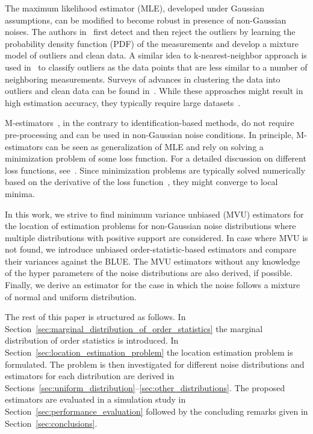 \documentclass{article}
\begin{document}
The maximum likelihood estimator (MLE), developed under Gaussian assumptions, can be modified to become robust in presence of non-Gaussian noises. The authors in~\citep{conf:ICML_eskin_00} first detect and then reject the outliers by learning the probability density function (PDF) of the measurements and develop a mixture model of outliers and clean data. A similar idea to k-nearest-neighbor approach is used in~\citep{article:DMKD_chawla_10} to classify outliers as the data points that are less similar to a number of neighboring measurements. Surveys of advances in clustering the data into outliers and clean data can be found in~\citep{article:AIR_hodge_04,article:ITSP_yin_13,conf:ICASSP_fritsche_09}. While these approaches might result in high estimation accuracy, they typically require large datasets~\citep{article:ISPM_zoubir_12}.

M-estimators~\citep{book:RS_huber}, in the contrary to identification-based methods, do not require pre-processing and can be used in non-Gaussian noise conditions. In principle, M-estimators can be seen as generalization of MLE and rely on solving a minimization problem of some loss function. For a detailed discussion on different loss functions, see~\citep{book:RS_huber}. Since minimization problems are typically solved numerically based on the derivative of the loss function~\citep{book:RSTM_maronna}, they might converge to local minima.

In this work, we strive to find minimum variance unbiased (MVU) estimators for the location of estimation problems for non-Gaussian noise distributions where multiple distributions with positive support are considered.  In case where MVU is not found, we introduce unbiased order-statistic-based estimators and compare their variances against the BLUE. The MVU estimators without any knowledge of the hyper parameters of the noise distributions are also derived, if possible. Finally, we derive an estimator for the case in which the noise follows a mixture of normal and uniform distribution.
%

The rest of this paper is structured  as follows. In Section~\ref{sec:marginal_distribution_of_order_statistics} the marginal distribution of order statistics is introduced. In Section~\ref{sec:location_estimation_problem} the location estimation problem is formulated. The problem is then investigated for different noise distributions and estimators for each distribution are derived in Sections~\ref{sec:uniform_distribution}--\ref{sec:other_distributions}. The proposed estimators are evaluated in a simulation study in Section~\ref{sec:performance_evaluation} followed by the concluding remarks given in Section~\ref{sec:conclusions}.
\end{document}
